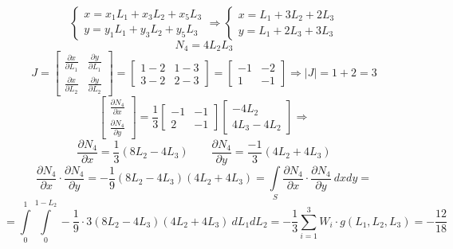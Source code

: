 \documentclass{bmstu}
\begin{document}
	\[
	\begin{cases}
		x=x_1L_1+x_3L_2+x_5L_3 \\
		y = y_1L_1+y_3L_2+y_5L_3 
	\end{cases}
	\Rightarrow \begin{cases}
		x=L_1+3L_2+2L_3 \\
		y=L_1+2L_3+3L_3
	\end{cases}
	\]
	\[
	N_4=4L_2L_3
	\]
	\[
	J=\begin{bmatrix}
		\frac{\partial x}{\partial L_1} & \frac{\partial y}{\partial L_1} \\
		\frac{\partial x}{\partial L_2} & \frac{\partial y}{\partial L_2}
	\end{bmatrix} = \begin{bmatrix}
	1-2 & 1-3 \\ 3-2 & 2-3 
	\end{bmatrix} = \begin{bmatrix}
	-1 & -2 \\ 1 & -1
	\end{bmatrix} \Rightarrow |J|=1+2=3
	\]
	\[
	\begin{bmatrix}
		\frac{\partial N_4}{\partial x} \\ \frac{\partial N_4}{\partial y}
	\end{bmatrix} = \frac{1}{3} \begin{bmatrix}
	-1 & -1 \\ 2 & -1 
	\end{bmatrix}\begin{bmatrix}
	-4L_2 \\ 4L_3-4L_2
	\end{bmatrix} \Rightarrow 
	\] 
	\[
	\frac{\partial N_4}{\partial x}=\frac{1}{3}(8L_2-4L_3) \qquad 
	\frac{\partial N_4}{\partial  y}=\frac{-1}{3}(4L_2+4L_3)
	\]
	\[
	\frac{\partial N_4}{\partial x}\cdot\frac{\partial N_4}{\partial y}=-\frac{1}{9}(8L_2-4L_3)(4L_2+4L_3)=\int\limits_S \frac{\partial N_4}{\partial x}\cdot\frac{\partial N_4}{\partial y}\ dxdy = 
	\]
	\[
	=\int\limits_0^1\int\limits_0^{1-L_2} -\frac{1}{9}\cdot 3 (8L_2-4L_3)(4L_2+4L_3) \ dL_1dL_2 = -\frac{1}{3} \sum\limits_{i=1}^{3} W_i\cdot g(L_1, L_2, L_3) = -\frac{12}{18}
	\]
	
\end{document}
